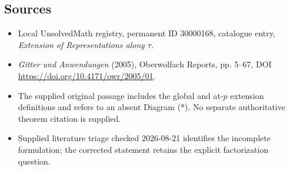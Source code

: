 \documentclass[11pt]{article}
\begin{document}
\subsection{Sources}
\begin{itemize}
\item Local UnsolvedMath registry, permanent ID 30000168, catalogue entry, \emph{Extension of Representations along \(\tau\)}.
\item \emph{Gitter und Anwendungen} (2005), Oberwolfach Reports, pp. 5--67, DOI \url{https://doi.org/10.4171/owr/2005/01}.
\item The supplied original passage includes the global and at-\(p\) extension definitions and refers to an absent Diagram (*). No separate authoritative theorem citation is supplied.
\item Supplied literature triage checked 2026-08-21 identifies the incomplete formulation; the corrected statement retains the explicit factorization question.
\end{itemize}
\end{document}
